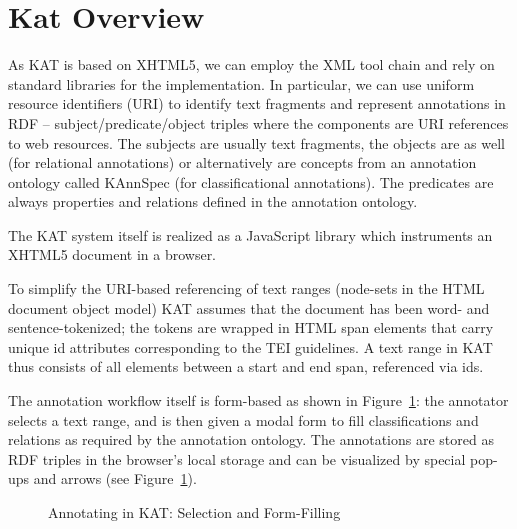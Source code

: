 \section{Kat Overview}

As KAT is based on XHTML5, we can employ the XML tool chain and rely on standard libraries for the implementation. In particular, we can use uniform resource identifiers (URI) to identify text fragments and represent annotations in RDF -- subject/predicate/object triples where the components are URI references to web resources. The subjects are usually text fragments, the objects are as well (for relational annotations) or alternatively are concepts from an annotation ontology called KAnnSpec (for classificational annotations). The predicates are always properties and relations defined in the annotation ontology.

The KAT system itself is realized as a JavaScript library which instruments an XHTML5 document in a browser.

To simplify the URI-based referencing of text ranges (node-sets in the HTML document object model) KAT assumes that the document has been word- and sentence-tokenized; the tokens are wrapped in HTML \textsf{span} elements that carry unique \textsf{id} attributes corresponding to the TEI guidelines. A text range in KAT thus consists of all elements between a start and end \textsf{span}, referenced via ids.

The annotation workflow itself is form-based as shown in Figure~\ref{fig:kat-annotate}: the annotator selects a text range, and is then given a modal form to fill classifications and relations as required by the annotation
ontology. The annotations are stored as RDF triples in the browser's local storage and can
be visualized by special pop-ups and arrows (see Figure~\ref{fig:kat-annotate}).

\begin{figure}[ht]\centering
  \caption{Annotating in KAT: Selection and Form-Filling}\label{fig:kat-annotate}
\end{figure}

